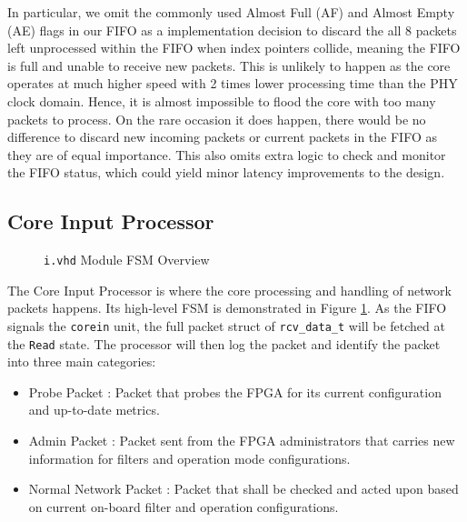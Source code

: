 \documentclass[a4paper]{report}
\newcommand{\code}{\texttt}
\begin{document}
In particular, we omit the commonly used Almost Full (AF) and Almost Empty (AE) flags in our FIFO as a implementation decision to discard the all 8 packets left unprocessed within the FIFO when index pointers collide, meaning the FIFO is full and unable to receive new packets. This is unlikely to happen as the core operates at much higher speed with 2 times lower processing time than the PHY clock domain. Hence, it is almost impossible to flood the core with too many packets to process. On the rare occasion it does happen, there would be no difference to discard new incoming packets or current packets in the FIFO as they are of equal importance. This also omits extra logic to check and monitor the FIFO status, which could yield minor latency improvements to the design.

\subsection{Core Input Processor}

\begin{figure}[h!]
  \caption{\code{i.vhd} Module FSM Overview}
  \label{fig:corein-fsm}
\end{figure}

The Core Input Processor is where the core processing and handling of network packets happens. Its high-level FSM is demonstrated in Figure \ref{fig:corein-fsm}. As the FIFO signals the \code{corein} unit, the full packet struct of \code{rcv\_data\_t} will be fetched at the \code{Read} state. The processor will then log the packet and identify the packet into three main categories:
\begin{itemize}
    \item Probe Packet : Packet that probes the FPGA for its current configuration and up-to-date metrics.
    \item Admin Packet : Packet sent from the FPGA administrators that carries new information for filters and operation mode configurations.
    \item Normal Network Packet : Packet that shall be checked and acted upon based on current on-board filter and operation configurations.
\end{itemize}
\end{document}
